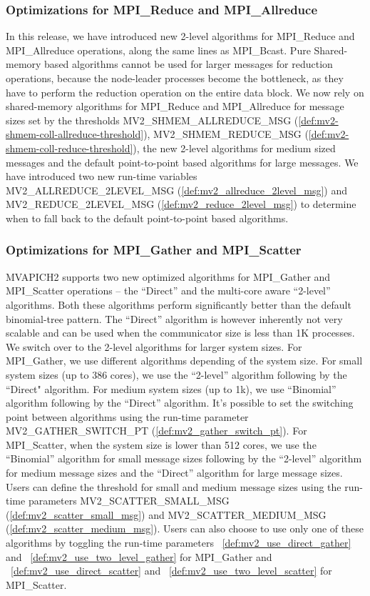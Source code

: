 \subsubsection{Optimizations for MPI\_Reduce and MPI\_Allreduce}
In this release, we have introduced new 2-level algorithms for MPI\_Reduce
and MPI\_Allreduce operations, along the same lines as MPI\_Bcast. 
Pure Shared-memory based algorithms cannot be used for larger messages
for reduction operations, because the node-leader processes become the bottleneck,
as they have to perform the reduction operation on the entire data block. 
We now rely on shared-memory algorithms for MPI\_Reduce and MPI\_Allreduce for message 
sizes set by the thresholds MV2\_SHMEM\_ALLREDUCE\_MSG (\ref{def:mv2-shmem-coll-allreduce-threshold}),
MV2\_SHMEM\_REDUCE\_MSG (\ref{def:mv2-shmem-coll-reduce-threshold}), 
the new 2-level algorithms for medium sized messages and the default
point-to-point based algorithms for large messages. We have 
introduced two new run-time variables MV2\_ALLREDUCE\_2LEVEL\_MSG (\ref{def:mv2_allreduce_2level_msg})
and MV2\_REDUCE\_2LEVEL\_MSG (\ref{def:mv2_reduce_2level_msg}) to determine when 
to fall back to the default point-to-point based algorithms.

\subsubsection{Optimizations for MPI\_Gather and MPI\_Scatter}
MVAPICH2 supports two new optimized algorithms for MPI\_Gather and MPI\_Scatter operations 
-- the ``Direct'' and the multi-core aware ``2-level'' algorithms. Both these algorithms 
perform significantly better than the default binomial-tree pattern. The ``Direct''
algorithm is however inherently not very scalable and can be used when the communicator size
is less than 1K processes. We switch over to the 2-level algorithms for larger system sizes. 
For MPI\_Gather, we use different algorithms depending of the system size. For small system sizes (up to 386 cores), we use the ``2-level'' algorithm following by the ``Direct" algorithm. 
For medium system sizes (up to 1k), we use ``Binomial'' algorithm following by the ``Direct'' algorithm. 
It's possible to set the switching point between algorithms using the 
run-time parameter MV2\_GATHER\_SWITCH\_PT (\ref{def:mv2_gather_switch_pt}). 
For MPI\_Scatter, when the system size is lower than 512 cores, we use the ``Binomial'' algorithm for small 
message sizes following by the ``2-level'' algorithm for medium message sizes and the ``Direct'' algorithm 
for large message sizes. 
Users can define the threshold for small and medium message sizes using the run-time parameters 
MV2\_SCATTER\_SMALL\_MSG (\ref{def:mv2_scatter_small_msg}) and 
MV2\_SCATTER\_MEDIUM\_MSG (\ref{def:mv2_scatter_medium_msg}).
Users can also choose to use only one of these algorithms by toggling the run-time parameters 
~\ref{def:mv2_use_direct_gather} and ~\ref{def:mv2_use_two_level_gather} for MPI\_Gather and 
~\ref{def:mv2_use_direct_scatter} and ~\ref{def:mv2_use_two_level_scatter} for MPI\_Scatter. 

